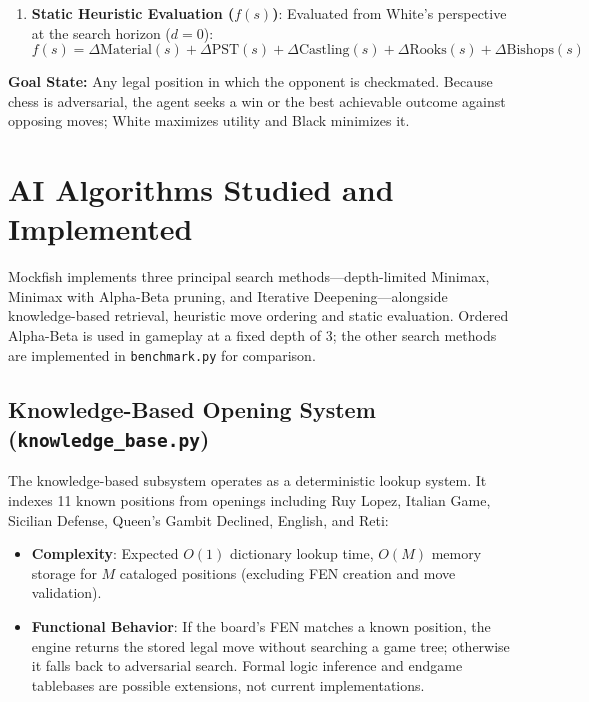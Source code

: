 \documentclass[11pt,a4paper]{article}
\begin{document}
\begin{enumerate}[leftmargin=*]
\[\begin{cases}
    -20,000-d & \text{if White is checkmated (Black wins)}\\
    0 & \text{if the position is treated as a draw}
    \end{cases}\]
    Remaining depth $d$ rewards faster mates and delays forced losses. Game draws include stalemate, insufficient material and claimable draws. The search additionally treats twofold repetition as a zero-score cutoff to discourage shuffling; twofold repetition alone is not an official terminal draw.
    \item \textbf{Static Heuristic Evaluation ($f(s)$)}: Evaluated from White's perspective at the search horizon ($d=0$):
    \[f(s)=\Delta\text{Material}(s)+\Delta\text{PST}(s)+\Delta\text{Castling}(s)+\Delta\text{Rooks}(s)+\Delta\text{Bishops}(s)\]
\end{enumerate}
\noindent\textbf{Goal State:} Any legal position in which the opponent is checkmated. Because chess is adversarial, the agent seeks a win or the best achievable outcome against opposing moves; White maximizes utility and Black minimizes it.
\section{AI Algorithms Studied and Implemented}
Mockfish implements three principal search methods---depth-limited Minimax, Minimax with Alpha-Beta pruning, and Iterative Deepening---alongside knowledge-based retrieval, heuristic move ordering and static evaluation. Ordered Alpha-Beta is used in gameplay at a fixed depth of 3; the other search methods are implemented in \texttt{benchmark.py} for comparison.
\subsection{Knowledge-Based Opening System (\texttt{knowledge\_base.py})}
The knowledge-based subsystem operates as a deterministic lookup system. It indexes 11 known positions from openings including Ruy Lopez, Italian Game, Sicilian Defense, Queen's Gambit Declined, English, and Reti:
\begin{itemize}[leftmargin=*]
    \item \textbf{Complexity}: Expected $O(1)$ dictionary lookup time, $O(M)$ memory storage for $M$ cataloged positions (excluding FEN creation and move validation).
    \item \textbf{Functional Behavior}: If the board's FEN matches a known position, the engine returns the stored legal move without searching a game tree; otherwise it falls back to adversarial search. Formal logic inference and endgame tablebases are possible extensions, not current implementations.
\end{itemize}
\end{document}
